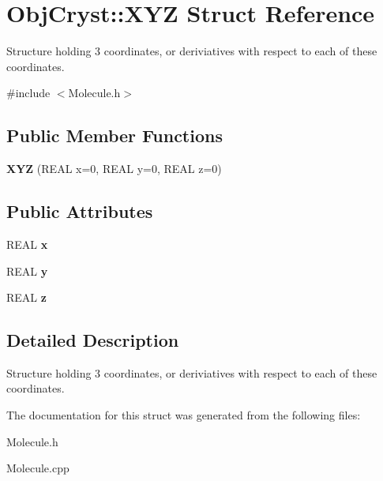 \hypertarget{struct_obj_cryst_1_1_x_y_z}{}\section{Obj\+Cryst\+::X\+YZ Struct Reference}
\label{struct_obj_cryst_1_1_x_y_z}


Structure holding 3 coordinates, or deriviatives with respect to each of these coordinates.  




{\ttfamily \#include $<$Molecule.\+h$>$}

\subsection*{Public Member Functions}
\begin{DoxyCompactItemize}
\item 
\mbox{\label{struct_obj_cryst_1_1_x_y_z_ae4cfcbc2f1f06734305b99aea62a9551}} 
{\bfseries X\+YZ} (R\+E\+AL x=0, R\+E\+AL y=0, R\+E\+AL z=0)
\end{DoxyCompactItemize}
\subsection*{Public Attributes}
\begin{DoxyCompactItemize}
\item 
\mbox{\label{struct_obj_cryst_1_1_x_y_z_a98bdadb23d017e4b57694e2543014933}} 
R\+E\+AL {\bfseries x}
\item 
\mbox{\label{struct_obj_cryst_1_1_x_y_z_a3e6889d0cf6d4b6fe0477467faf46e08}} 
R\+E\+AL {\bfseries y}
\item 
\mbox{\label{struct_obj_cryst_1_1_x_y_z_a8625df962c37093db37747e63c371e3f}} 
R\+E\+AL {\bfseries z}
\end{DoxyCompactItemize}


\subsection{Detailed Description}
Structure holding 3 coordinates, or deriviatives with respect to each of these coordinates. 

The documentation for this struct was generated from the following files\+:\begin{DoxyCompactItemize}
\item 
Molecule.\+h\item 
Molecule.\+cpp\end{DoxyCompactItemize}
